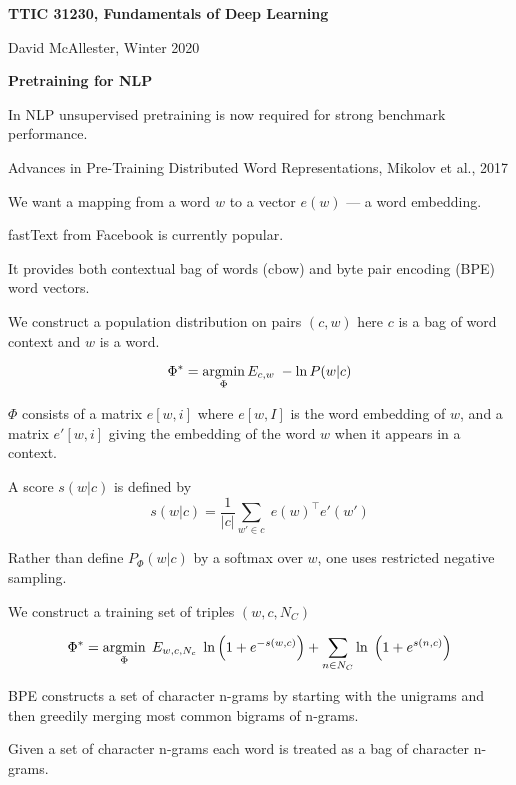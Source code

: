 





{\Huge
  \centerline{\bf TTIC 31230,  Fundamentals of Deep Learning}
  \vfill
  \centerline{David McAllester, Winter 2020}
  \vfill
  \centerline{\bf Pretraining for NLP}
  \vfill
  \vfill


In NLP unsupervised pretraining is now required for strong benchmark performance.



Advances in Pre-Training Distributed Word Representations, Mikolov et al., 2017

\vfill
We want a mapping from a word $w$ to a vector $e(w)$ --- a word embedding.

\vfill
{\color{red} fastText} from Facebook is currently popular.

\vfill
It provides both contextual bag of words (cbow) and byte pair encoding (BPE) word vectors.


We construct a population distribution on pairs $(c,w)$ here $c$ is a bag of word context and $w$ is a word.

\vfill
$$\Phi^* = \operatorname*{argmin}_\Phi E_{c,w}\;-\ln P(w|c)$$

\vfill
$\Phi$ consists of a matrix $e[w,i]$ where $e[w,I]$ is the word embedding of $w$, and a matrix $e'[w,i]$ giving the embedding of the word
$w$ when it appears in a context.

\vfill
A score $s(w|c)$ is defined by
$$s(w|c) = \frac{1}{|c|} \sum_{w' \in c}\;e(w)^\top e'(w')$$


\vfill
Rather than define $P_\Phi(w|c)$ by a softmax over $w$, one uses restricted negative sampling.

\vfill
We construct a training set of triples $(w,c,N_C)$

\vfill
$$\Phi^* = \operatorname*{argmin}_\Phi\;E_{w,c,N_c}\;\ln\left(1 + e^{-s(w,c)}\right) + \sum_{n \in N_C} \ln\;\left(1 + e^{s(n,c)}\right)$$


BPE constructs a set of character n-grams by starting with the unigrams and then greedily merging most common bigrams of n-grams.

\vfill
Given a set of character n-grams each word is treated as a bag of character n-grams.

}
